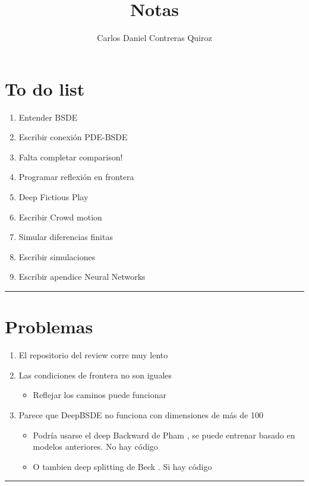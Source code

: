 \documentclass{article}
\title{Notas}
\author{Carlos Daniel Contreras Quiroz}
\newcommand{\HRule}{\rule{\linewidth}{0.5mm}}
\begin{document}
	\maketitle%
	\vspace{5mm}
	\section*{To do list}
	\begin{enumerate}
		\item Entender BSDE \greencheck
		\item Escribir conexión PDE-BSDE
		\item Falta completar comparison!
		\item Programar reflexión en frontera
		\item Deep Fictious Play
		\item Escribir Crowd motion
		\item Simular diferencias finitas
		\item Escribir simulaciones
		\item Escribir apendice Neural Networks
	\end{enumerate}
    \HRule\par
	\section*{Problemas}
	\begin{enumerate}
		\item El repositorio del review corre muy lento \bluecheck
		\item Las condiciones de frontera no son iguales
		\begin{itemize}
			\item Reflejar los caminos puede funcionar \redwrong
		\end{itemize}
		\item Parece que DeepBSDE no funciona con dimensiones de más de 100
		\begin{itemize}
			\item Podría usarse el deep Backward de Pham \cite{hure_deep_2020}, se puede entrenar basado en modelos anteriores. No hay código
			\item O tambien deep splitting de Beck \cite{beck_deep_2021}. Si hay código
		\end{itemize}
	\end{enumerate}
    \HRule\par
\end{document}
